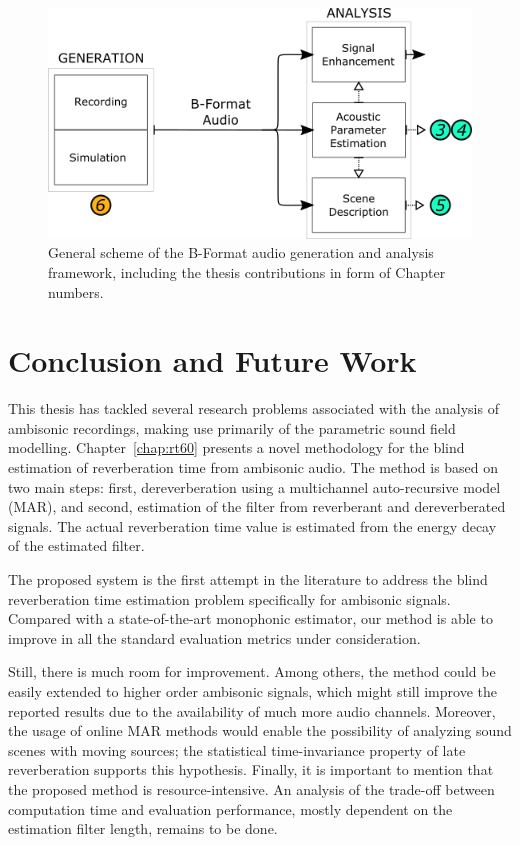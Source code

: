   \begin{figure}[h!]
  \includegraphics[width=\textwidth]{Figures/Introduction/SCHEME1_NUMBERS.png}
  \caption{General scheme of the B-Format audio generation and analysis framework, including the thesis contributions in form of Chapter numbers.}
  \label{fig:scheme1_numbers2}
\end{figure}




\section{Conclusion and Future Work}

This thesis has tackled several research problems associated with the analysis of ambisonic recordings, making use primarily of the parametric sound field modelling.
Chapter~\ref{chap:rt60} presents a novel methodology for the blind estimation of reverberation time from ambisonic audio. The method is based on two main steps: first, dereverberation using a multichannel auto-recursive model (MAR), and second, estimation of the  filter from reverberant and dereverberated signals. The actual reverberation time value is estimated from the energy decay of the estimated filter. 

The proposed system is the first attempt in the literature to address the blind reverberation time estimation problem specifically for ambisonic signals. Compared with a state-of-the-art monophonic estimator, our method is able to improve in all the standard evaluation metrics under consideration.

Still, there is much room for improvement. Among others, the method could be easily extended to higher order ambisonic signals, which might still improve the reported results due to the availability of much more audio channels. Moreover, the usage of online MAR methods would enable the possibility of analyzing sound scenes with moving sources; the statistical time-invariance property of late reverberation supports this hypothesis. Finally, it is important to mention that the proposed method is resource-intensive. An analysis of the trade-off between computation time and evaluation performance, mostly dependent on the estimation filter length, remains to be done.  

